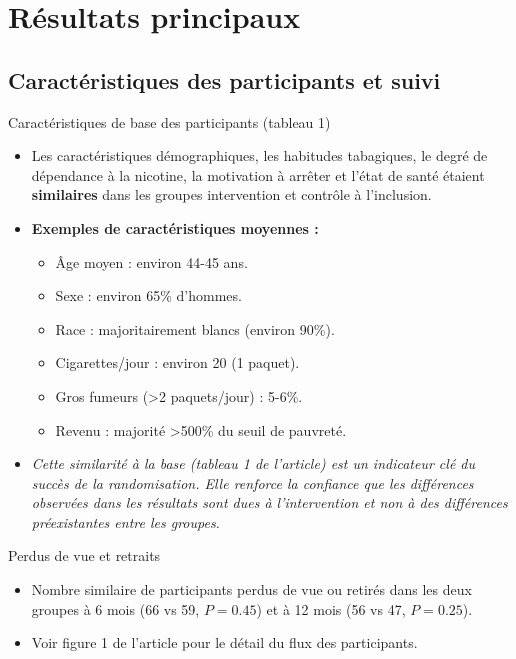 \documentclass[aspectratio=169,xcolor=dvipsnames]{beamer}
\begin{document}
\section{Résultats principaux}
\subsection{Caractéristiques des participants et suivi}

\begin{frame}{Caractéristiques de base des participants (tableau 1)}
    \begin{itemize}
        \item Les caractéristiques démographiques, les habitudes tabagiques, le degré de dépendance à la nicotine, la motivation à arrêter et l'état de santé étaient \textbf{similaires} dans les groupes intervention et contrôle à l'inclusion.
        \item \textbf{Exemples de caractéristiques moyennes :}
            \begin{itemize}
                \item Âge moyen : environ 44-45 ans.
                \item Sexe : environ 65\% d'hommes.
                \item Race : majoritairement blancs (environ 90\%).
                \item Cigarettes/jour : environ 20 (1 paquet).
                \item Gros fumeurs (>2 paquets/jour) : 5-6\%.
                \item Revenu : majorité >500\% du seuil de pauvreté.
            \end{itemize}
        \item \textit{Cette similarité à la base (tableau 1 de l'article) est un indicateur clé du succès de la randomisation. Elle renforce la confiance que les différences observées dans les résultats sont dues à l'intervention et non à des différences préexistantes entre les groupes.}
    \end{itemize}
    \begin{block}{Perdus de vue et retraits}
        \begin{itemize}
            \item Nombre similaire de participants perdus de vue ou retirés dans les deux groupes à 6 mois (66 vs 59, $P=0.45$) et à 12 mois (56 vs 47, $P=0.25$).
            \item Voir figure 1 de l'article pour le détail du flux des participants.
        \end{itemize}
    \end{block}
\end{frame}
\end{document}
